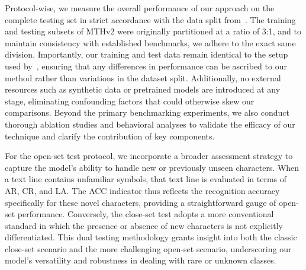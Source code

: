 Protocol-wise, we measure the overall performance of our approach on the complete testing set in strict accordance with the data split from~\cite{jla}. The training and testing subsets of MTHv2 were originally partitioned at a ratio of 3:1, and to maintain consistency with established benchmarks, we adhere to the exact same division. Importantly, our training and test data remain identical to the setup used by~\cite{jla}, ensuring that any differences in performance can be ascribed to our method rather than variations in the dataset split. Additionally, no external resources such as synthetic data or pretrained models are introduced at any stage, eliminating confounding factors that could otherwise skew our comparisons. Beyond the primary benchmarking experiments, we also conduct thorough ablation studies and behavioral analyses to validate the efficacy of our technique and clarify the contribution of key components.

For the open-set test protocol, we incorporate a broader assessment strategy to capture the model’s ability to handle new or previously unseen characters. When a text line contains unfamiliar symbols, that text line is evaluated in terms of AR, CR, and LA. The ACC indicator thus reflects the recognition accuracy specifically for these novel characters, providing a straightforward gauge of open-set performance. Conversely, the close-set test adopts a more conventional standard in which the presence or absence of new characters is not explicitly differentiated. This dual testing methodology grants insight into both the classic close-set scenario and the more challenging open-set scenario, underscoring our model’s versatility and robustness in dealing with rare or unknown classes.


%



